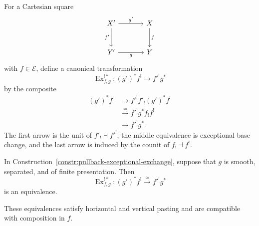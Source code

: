 \begin{construction}
\label{constr:pullback-exceptional-exchange}
For a Cartesian square
\[
\begin{tikzcd}[column sep=large,row sep=large]
    X' \arrow[r,"g'"] \arrow[d,"f'"']
        & X \arrow[d,"f"] \\
    Y' \arrow[r,"g"']
        & Y
\end{tikzcd}
\]
with \(f\in\mathcal E\), define a canonical transformation
\[
    \operatorname{Ex}^{!*}_{f,g}:
    (g')^*f^!
    \longrightarrow
    f'^!g^*
\]
by the composite
\[
\begin{aligned}
    (g')^*f^!
    &\longrightarrow
    f'^!f'_!(g')^*f^! \\
    &\xrightarrow{\simeq}
    f'^!g^*f_!f^! \\
    &\longrightarrow
    f'^!g^*.
\end{aligned}
\]
The first arrow is the unit of \(f'_!\dashv f'^!\), the middle equivalence
is exceptional base change, and the last arrow is induced by the counit of
\(f_!\dashv f^!\).
\end{construction}

\begin{proposition}
\label{prop:smooth-pullback-exceptional-exchange}
In Construction~\ref{constr:pullback-exceptional-exchange}, suppose that
\(g\) is smooth, separated, and of finite presentation.  Then
\[
    \operatorname{Ex}^{!*}_{f,g}:
    (g')^*f^!
    \xrightarrow{\simeq}
    f'^!g^*
\]
is an equivalence.

These equivalences satisfy horizontal and vertical pasting and are
compatible with composition in \(f\).
\end{proposition}

